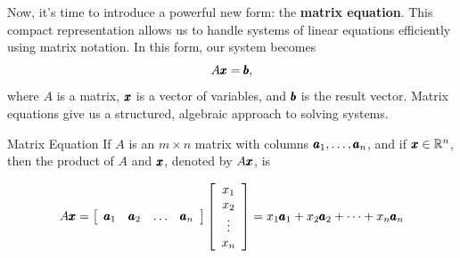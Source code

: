 Now, it's time to introduce a powerful new form: the \textbf{matrix equation}. This compact representation allows us to handle systems of linear equations efficiently using matrix notation. In this form, our system becomes  
\[
A \pmb{x} = \pmb{b},
\]
where \(A\) is a matrix, \(\pmb{x}\) is a vector of variables, and \(\pmb{b}\) is the result vector. Matrix equations give us a structured, algebraic approach to solving systems.

\begin{definition}{Matrix Equation}
  If $A$ is an $m \times n$ matrix with columns $\pmb{a}_1, \ldots, \pmb{a}_n$, and if $\pmb{x} \in \mathbb{R}^n$, then the product of $A$ and $\pmb{x}$, denoted by $A \pmb{x}$, is

\[
A \pmb{x} = \left[\begin{array}{llll}
\pmb{a}_1 & \pmb{a}_2 & \ldots & \pmb{a}_n
\end{array}\right] \left[\begin{array}{c}
x_1 \\
x_2 \\
\vdots \\
x_n
\end{array}\right] = x_1 \pmb{a}_1 + x_2 \pmb{a}_2 + \cdots + x_n \pmb{a}_n
\]
    
\end{definition}

